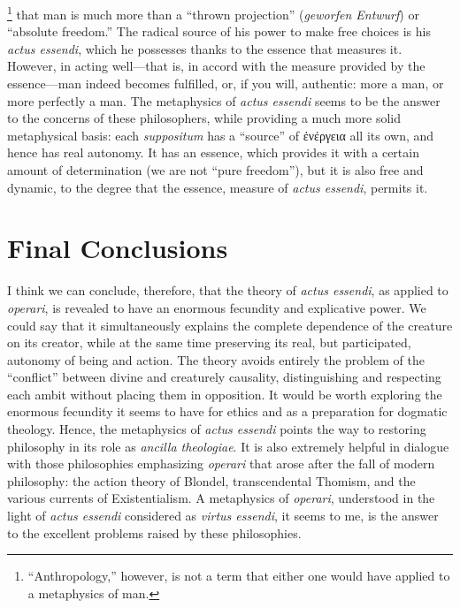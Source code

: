 %
\footnote{“Anthropology,” however, is not a term that either one would have applied to a metaphysics of man.}
%
that man is much more than a “thrown projection” (\emph{geworfen Entwurf}) or “absolute freedom.” The radical source of his power to make free choices is his \emph{actus essendi}, which he possesses thanks to the essence that measures it. However, in acting well—that is, in accord with the measure provided by the essence—man indeed becomes fulfilled, or, if you will, authentic: more a man, or more perfectly a man.
%
The metaphysics of \emph{actus essendi} seems to be the answer to the concerns of these philosophers, while providing a much more solid metaphysical basis: each \emph{suppositum} has a “source” of ἐνέργεια all its own, and hence has real autonomy. It has an essence, which provides it with a certain amount of determination (we are not “pure freedom”), but it is also free and dynamic, to the degree that the essence, measure of \emph{actus essendi}, permits it.

\section{Final Conclusions}

I think we can conclude, therefore, that the theory of \emph{actus essendi}, as applied to \emph{operari}, is revealed to have an enormous fecundity and explicative power. We could say that it simultaneously explains the complete dependence of the creature on its creator, while at the same time preserving its real, but participated, autonomy of being and action. The theory avoids entirely the problem of the “conflict” between divine and creaturely causality, distinguishing and respecting each ambit without placing them in opposition. It would be worth exploring the enormous fecundity it seems to have for ethics and as a preparation for dogmatic theology. Hence, the metaphysics of \emph{actus essendi} points the way to restoring philosophy in its role as \emph{ancilla theologiae}. It is also extremely helpful in dialogue with those philosophies emphasizing \emph{operari} that arose after the fall of modern philosophy: the action theory of Blondel, transcendental Thomism, and the various currents of Existentialism. A metaphysics of \emph{operari}, understood in the light of \emph{actus essendi} considered as \emph{virtus essendi}, it seems to me, is the answer to the excellent problems raised by these philosophies. 

